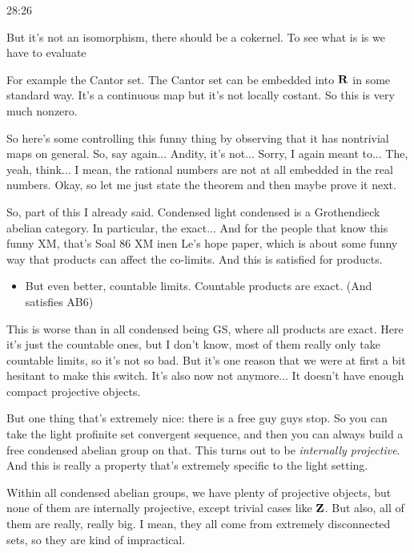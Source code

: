 \begin{example}
\begin{unfinished}{28:26}
\begin{remark}
\begin{remark}
\begin{example}
But it's not an isomorphism, there should be a cokernel. To see what is is we have to evaluate


For example the Cantor set. The Cantor set can be embedded into $\mathbf R$ in some standard way. It's a continuous map but it's not locally costant. So this is very much nonzero.

So here's some controlling this funny thing by observing that it has nontrivial maps on general. So, say again... Andity, it's not... Sorry, I again meant to... The, yeah, think... I mean, the rational numbers are not at all embedded in the real numbers. Okay, so let me just state the theorem and then maybe prove it next.

\end{example}

So, part of this I already said. Condensed light condensed is a Grothendieck abelian category. In particular, the  exact...   And for the people that know this funny XM, that's Soal 86 XM inen Le's hope paper, which is about some funny way that products can affect the co-limits. And this is satisfied for products.

\begin{itemize}
\item But even better, countable limits. Countable products are exact. (And satisfies AB6)

\end{itemize}

This is worse than in all condensed being GS, where all products are exact. Here it's just the countable ones, but I don't know, most of them really only take countable limits, so it's not so bad. But it's one reason that we were at first a bit hesitant to make this switch. It's also now not anymore... It doesn't have enough compact projective objects.

But one thing that's extremely nice: there is a free guy guys stop. So you can take the light profinite set convergent sequence, and then you can always build a free condensed abelian group on that. This turns out to be \emph{internally projective}. And this is really a property that's extremely specific to the light setting.

Within all condensed abelian groups, we have plenty of projective objects, but none of them are internally projective, except trivial cases like $\mathbf Z$. But also, all of them are really, really big. I mean, they all come from extremely disconnected sets, so they are kind of impractical.


\end{remark}
\end{remark}
\end{unfinished}
\end{example}
